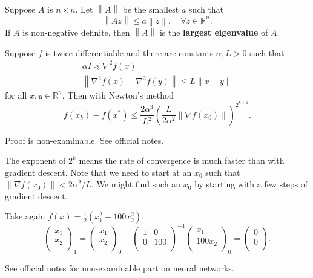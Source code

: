 \begin{definition}
    Suppose $A$ is $n\times n$. Let $ \left\| A \right\| $ be the smallest $a$ such that 
    \[
        \left\| A z \right\| \le a \left\| z \right\|,\quad \forall z\in \mathbb{R}^{n}.
    \]
    If $A$ is non-negative definite, then $\left\| A \right\|$ is the \textbf{largest eigenvalue} of $A$. 
\end{definition}

\begin{theorem}
    Suppose $f$ is twice differentiable and there are constants $\alpha, L>0$ such that
\[
\begin{gathered}
\alpha I \preceq \nabla^2 f(x) \\
\left\|\nabla^2 f(x)-\nabla^2 f(y)\right\| \leq L\|x-y\|
\end{gathered}
\]
for all $x, y \in \mathbb{R}^n$. Then with Newton's method
\[
f\left(x_k\right)-f\left(x^*\right) \leq \frac{2 \alpha^3}{L^2}\left(\frac{L}{2 \alpha^2}\left\|\nabla f\left(x_0\right)\right\|\right)^{2^{k+1}}.
\]
\end{theorem}

Proof is non-examinable. See official notes. 

\begin{note}
    The exponent of $2^k$ means the rate of convergence is much faster than with gradient descent. Note that we need to start at an $x_0$ such that $\left\|\nabla f\left(x_0\right)\right\|<2 \alpha^2 / L$. We might find such an $x_0$ by starting with a few steps of gradient descent.
\end{note}

\begin{example}
    Take again $ f(x) = \frac{1}{2}(x_1^2+100x_2^2) $. 
    \[
        \begin{pmatrix}
             x_1 \\
             x_2 \\
        \end{pmatrix}_1 = \begin{pmatrix}
             x_1 \\
             x_2 \\
        \end{pmatrix}_0 - \begin{pmatrix}
            1 &  0 \\
            0 &  100 \\
        \end{pmatrix}^{-1} \begin{pmatrix}
             x_1 \\
             100x_2 \\
        \end{pmatrix}_0 = \begin{pmatrix}
             0 \\
             0 \\
        \end{pmatrix}.
    \]
\end{example}
See official notes for non-examinable part on neural networks. 
\newpage